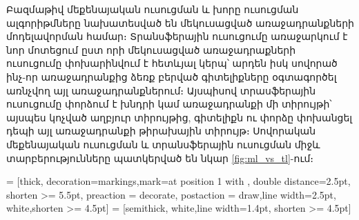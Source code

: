\documentclass[12pt]{article}
\begin{document}
 \par Բազմաթիվ մեքենայական ուսուցման և խորը ուսուցման ալգորիթմները նախատեսված են մեկուսացված առաջադրանքների մոդելավորման համար։  Տրանսֆերային ուսուցումը առաջարկում է նոր մոտեցում ըստ որի մեկուսացված առաջադրաքների ուսուցումը փոխարինվում է հետևյալ կերպ՝ արդեն իսկ սովորած ինչ-որ առաջադրանքից ձեռք բերված գիտելիքները օգտագործել առնչվող այլ  առաջադրանքներում։  Այսպիսով տրասֆերային ուսուցումը փորձում է խնդրի  կամ առաջադրանքի մի տիրույթի՝ այսպես կոչված աղբյուր տիրույթից, գիտելիքն ու փորձը փոխանցել դեպի այլ  առաջադրանքի թիրախային տիրույթ։ Սովորական մեքենայական ուսուցման և տրանսֆերային ուսուցման միջև տարբերությունները պատկերված են նկար \ref{fig:ml_vs_tl}-ում։


 = [thick, decoration={markings,mark=at position
   1 with {}},
   double distance=2.5pt, shorten >= 5.5pt,
   preaction = {decorate},
   postaction = {draw,line width=2.5pt, white,shorten >= 4.5pt}]
 = [semithick, white,line width=1.4pt, shorten >= 4.5pt]
\end{document}
